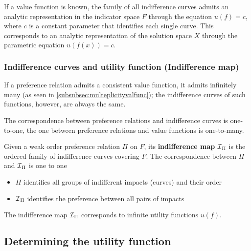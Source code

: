 If a value function is known, the family of all indifference curves admits an analytic representation in the indicator space $F$ through the equation $u(f) = c$, where $c$ is a constant parameter that identifies each single curve. This corresponds to an analytic representation of the solution space $X$ through the parametric equation $u(f(x)) = c$.

\subsubsection{Indifference curves and utility function (Indifference map)}

If a preference relation admits a consistent value function, it admits infinitely many (as seen in \ref{subsubsec:multeplicityvalfunc}); the indifference curves of such functions, however, are always the same. 

The correspondence between preference relations and indifference curves is one-to-one, the one between preference relations and value functions is one-to-many.

Given a weak order preference relation $\Pi$ on $F$, its \textbf{indifference map} $\operatorname{\mathcal{I}}_\Pi$ is the ordered family of indifference curves covering $F$. The correspondence between $\Pi$ and $\operatorname{\mathcal{I}}_\Pi$ is one to one
\begin{itemize}
	\item $\Pi$ identifies all groups of indifferent impacts (curves) and their order
	
	\item $\operatorname{\mathcal{I}}_\Pi$ identifies the preference between all pairs of impacts
\end{itemize}

The indifference map $\operatorname{\mathcal{I}}_\Pi$ corresponds to infinite utility functions $u(f)$.

\subsection{Determining the utility function}
\label{subsec:detutility}

